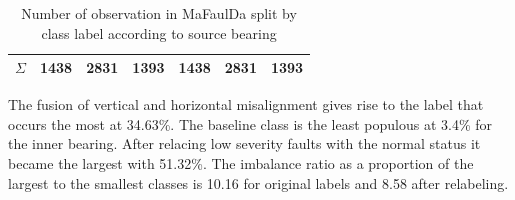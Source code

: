 \begin{table}[h]
\begin{tabular}{|ll|r|r|r|r|r|r|}
\multicolumn{2}{|l|}{$\Sigma$}                                                    & \textbf{1438}           & \textbf{2831}            & \textbf{1393}           & \textbf{1438}            & \textbf{2831}            & \textbf{1393}            \\ \hline
\end{tabular}
\caption{Number of observation in MaFaulDa split by class label according to source bearing}
\label{tab:design:label-count}
\end{table}

The fusion of vertical and horizontal misalignment gives rise to the label that occurs the most at 34.63\%. The baseline class is the least populous at 3.4\% for the inner bearing. After relacing low severity faults with the normal status it became the largest with 51.32\%. The imbalance ratio as a proportion of the largest to the smallest classes is 10.16 for original labels and 8.58 after relabeling.

